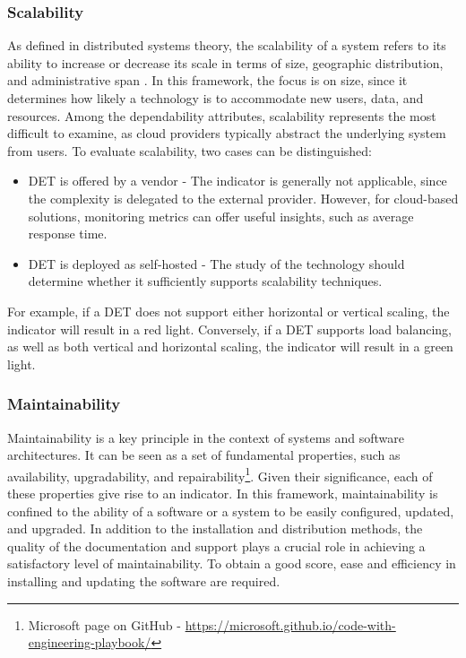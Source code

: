 \subsubsection{Scalability}
As defined in distributed systems theory, the scalability of a system refers to its ability to increase or decrease its scale in terms of size, geographic distribution, and administrative span \cite{tanenbaum_distributed_2006}. In this framework, the focus is on size, since it determines how likely a technology is to accommodate new users, data, and resources. Among the dependability attributes, scalability represents the most difficult to examine, as cloud providers typically abstract the underlying system from users. To evaluate scalability, two cases can be distinguished:
\begin{itemize}[noitemsep, topsep=4pt, parsep=0pt, partopsep=0pt]
    \item DET is offered by a vendor - The indicator is generally not applicable, since the complexity is delegated to the external provider. However, for cloud-based solutions, monitoring metrics can offer useful insights, such as average response time.
    \item DET is deployed as self-hosted - The study of the technology should determine whether it sufficiently supports scalability techniques.
\end{itemize}
For example, if a DET does not support either horizontal or vertical scaling, the indicator will result in a red light. Conversely, if a DET supports load balancing, as well as both vertical and horizontal scaling, the indicator will result in a green light.

\subsubsection{Maintainability}
Maintainability is a key principle in the context of systems and software architectures. It can be seen as a set of fundamental properties, such as availability, upgradability, and repairability\footnote{Microsoft page on GitHub - \href{https://microsoft.github.io/code-with-engineering-playbook/non-functional-requirements/maintainability/}{https://microsoft.github.io/code-with-engineering-playbook/}}. Given their significance, each of these properties give rise to an indicator. In this framework, maintainability is confined to the ability of a software or a system to be easily configured, updated, and upgraded. In addition to the installation and distribution methods, the quality of the documentation and support plays a crucial role in achieving a satisfactory level of maintainability. To obtain a good score, ease and efficiency in installing and updating the software are required.

